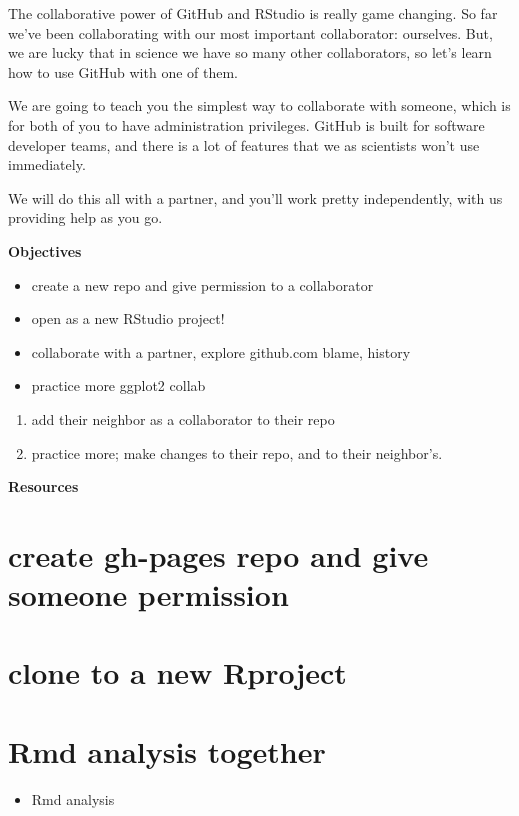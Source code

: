 \documentclass[]{book}
\providecommand{\tightlist}{%
  \setlength{\itemsep}{0pt}\setlength{\parskip}{0pt}}
\theoremstyle{definition}
\theoremstyle{definition}
\theoremstyle{definition}
\theoremstyle{remark}
\begin{document}
The collaborative power of GitHub and RStudio is really game changing.
So far we've been collaborating with our most important collaborator:
ourselves. But, we are lucky that in science we have so many other
collaborators, so let's learn how to use GitHub with one of them.

We are going to teach you the simplest way to collaborate with someone,
which is for both of you to have administration privileges. GitHub is
built for software developer teams, and there is a lot of features that
we as scientists won't use immediately.

We will do this all with a partner, and you'll work pretty
independently, with us providing help as you go.

\textbf{Objectives}

\begin{itemize}
\tightlist
\item
  create a new repo and give permission to a collaborator
\item
  open as a new RStudio project!
\item
  collaborate with a partner, explore github.com blame, history
\item
  practice more ggplot2 collab
\end{itemize}

\begin{enumerate}
\def\labelenumi{\arabic{enumi}.}
\tightlist
\item
  add their neighbor as a collaborator to their repo
\item
  practice more; make changes to their repo, and to their neighbor's.
\end{enumerate}

\textbf{Resources}

\section{create gh-pages repo and give someone
permission}\label{create-gh-pages-repo-and-give-someone-permission}

\section{clone to a new Rproject}\label{clone-to-a-new-rproject}

\section{Rmd analysis together}\label{rmd-analysis-together}

\begin{itemize}
\tightlist
\item
  Rmd analysis
\end{itemize}
\end{document}
